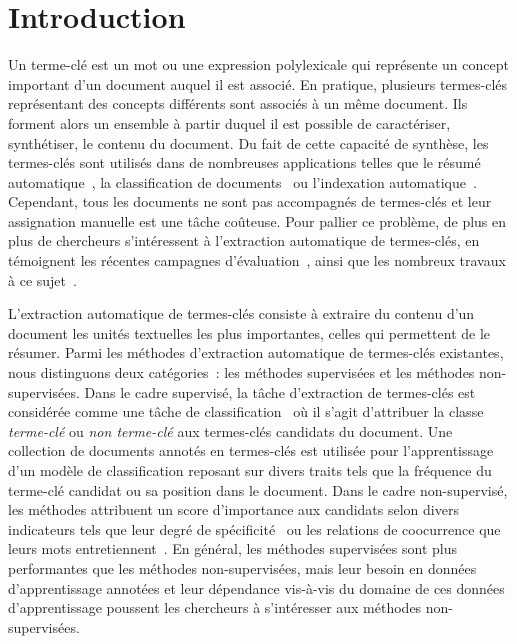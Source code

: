 \section{Introduction}
\label{sec:introduction}
  Un terme-clé est un mot ou une expression polylexicale qui représente un
  concept important d'un document auquel il est associé. En pratique, plusieurs
  termes-clés représentant des concepts différents sont associés à un même
  document. Ils forment alors un ensemble à partir duquel il est possible de
  caractériser, synthétiser, le contenu du document. Du fait de cette capacité
  de synthèse, les termes-clés sont utilisés dans de nombreuses applications
  telles que le résumé automatique~\cite{avanzo2005keyphrase}, la classification
  de documents~\cite{han2007webdocumentclustering} ou l'indexation
  automatique~\cite{medelyan2008smalltrainingset}. Cependant, tous les documents
  ne sont pas accompagnés de termes-clés et leur assignation manuelle est une
  tâche coûteuse. Pour pallier ce problème, de plus en plus de chercheurs
  s'intéressent à l'extraction automatique de termes-clés, en témoignent les
  récentes campagnes d'évaluation~\cite{paroubek2012deft,kim2010semeval}, ainsi
  que les nombreux travaux à ce sujet~\cite{hasan2014state_of_the_art}.

  L'extraction automatique de termes-clés consiste à extraire du contenu d'un
  document les unités textuelles les plus importantes, celles qui permettent de
  le résumer. Parmi les méthodes d'extraction automatique de termes-clés
  existantes, nous distinguons deux catégories~: les méthodes supervisées et les
  méthodes non-supervisées. Dans le cadre supervisé, la tâche d'extraction de
  termes-clés est considérée comme une tâche de
  classification~\cite{witten1999kea} où il s'agit d'attribuer la classe
  \og{}\textit{terme-clé}\fg{} ou \og{}\textit{non terme-clé}\fg{} aux
  termes-clés candidats du document. Une collection de
  documents annotés en termes-clés est utilisée pour l'apprentissage d'un
  modèle de classification reposant sur divers traits tels que la fréquence du
  terme-clé candidat ou sa position dans le document. Dans le cadre
  non-supervisé, les méthodes attribuent un score d'importance aux candidats
  selon divers indicateurs tels que leur degré de
  spécificité~\cite{jones1972tfidf} ou les relations de coocurrence que leurs
  mots entretiennent~\cite{mihalcea2004textrank}. En général, les méthodes
  supervisées sont plus performantes que les méthodes non-supervisées, mais leur
  besoin en données d'apprentissage annotées et leur dépendance vis-à-vis du
  domaine de ces données d'apprentissage poussent les chercheurs à s'intéresser
  aux méthodes non-supervisées.

